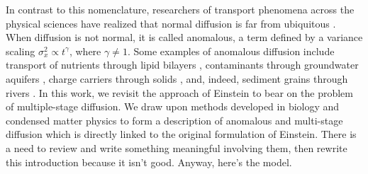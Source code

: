 \documentclass[]{agujournal2018}
\begin{document}
In contrast to this nomenclature, researchers of transport phenomena across the physical sciences have realized that normal diffusion is far from ubiquitous \citep{Shlesinger1993}.
When diffusion is not normal, it is called anomalous, a term defined by a variance scaling $\sigma_x^2 \propto t^\gamma$, where $\gamma \neq 1$. 
Some examples of anomalous diffusion include transport of nutrients through lipid bilayers \citep[e.g.][]{Jeon2012,Molina-Garcia2018}, contaminants through groundwater aquifers \citep[e.g.][]{AaraoReis2014,Yang2019}, charge carriers through solids \citep[e.g.][]{Scher1973}, and, indeed, sediment grains through rivers \citep{Hassan2017,Phillips2013,Martin2012,Bradley2017}.
In this work, we revisit the approach of Einstein to bear on the problem of multiple-stage diffusion.
We draw upon methods developed in biology and condensed matter physics to form a description of anomalous and multi-stage diffusion which is directly linked to the original formulation of Einstein.
There is a need to review \citet{Wu2019, Zhang2012, Hassan2017, Phillips2013, Martin2012} and write something meaningful involving them, then rewrite this introduction because it isn't good.
Anyway, here's the model.
\end{document}
